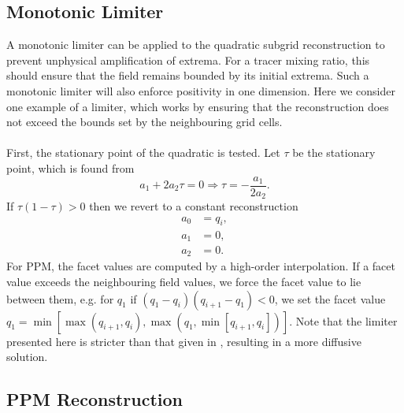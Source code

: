\documentclass{ametsocV6.1}
\begin{document}
\subsection{Monotonic Limiter} \label{sec:limiter}
A monotonic limiter can be applied to the quadratic subgrid reconstruction to prevent unphysical amplification of extrema.
For a tracer mixing ratio, this should ensure that the field remains bounded by its initial extrema.
Such a monotonic limiter will also enforce positivity in one dimension. 
Here we consider one example of a limiter, which works by ensuring that the reconstruction does not exceed the bounds set by the neighbouring grid cells.  \\
\\
First, the stationary point of the quadratic is tested. Let $\tau$ be the stationary point, which is found from
\begin{equation}
a_1 + 2 a_2 \tau  = 0 \Rightarrow \tau = - \frac{a_1}{2 a_2}. 
\end{equation}
If $\tau(1-\tau) > 0$ then we revert to a constant reconstruction
\begin{subequations}
\begin{align}
    a_0 &= q_i, \\
    a_1 &= 0, \\
    a_2 &= 0.
\end{align}
\end{subequations}
For PPM, the facet values are computed by a high-order interpolation. If a facet value exceeds the neighbouring field values, we force the facet value to lie between them, e.g. for $q_1$ if $(q_1 - q_i)( q_{i+1} - q_1) < 0$, we set the facet value $q_1 = \min[ \max(q_{i+1},q_i), \max(q_1, \min[q_{i+1},q_i]) ]$. Note that the limiter presented here is stricter than that given in \citep{colella1984ppm}, resulting in a more diffusive solution. 

\subsection{PPM Reconstruction} \label{sec:consistent_ppm}
\end{document}
